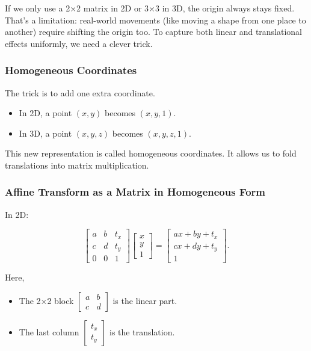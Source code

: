 \documentclass[
  letterpaper,
  DIV=11,
  numbers=noendperiod]{scrreprt}
\providecommand{\tightlist}{%
  \setlength{\itemsep}{0pt}\setlength{\parskip}{0pt}}
\begin{document}
If we only use a 2×2 matrix in 2D or 3×3 in 3D, the origin always stays
fixed. That's a limitation: real-world movements (like moving a shape
from one place to another) require shifting the origin too. To capture
both linear and translational effects uniformly, we need a clever trick.

\subsubsection{Homogeneous Coordinates}\label{homogeneous-coordinates}

The trick is to add one extra coordinate.

\begin{itemize}
\tightlist
\item
  In 2D, a point \((x, y)\) becomes \((x, y, 1)\).
\item
  In 3D, a point \((x, y, z)\) becomes \((x, y, z, 1)\).
\end{itemize}

This new representation is called homogeneous coordinates. It allows us
to fold translations into matrix multiplication.

\subsubsection{Affine Transform as a Matrix in Homogeneous
Form}\label{affine-transform-as-a-matrix-in-homogeneous-form}

In 2D:

\[
\begin{bmatrix} 
a & b & t_x \\ 
c & d & t_y \\ 
0 & 0 & 1 
\end{bmatrix}
\begin{bmatrix} 
x \\ y \\ 1
\end{bmatrix}
=
\begin{bmatrix} 
ax + by + t_x \\ 
cx + dy + t_y \\ 
1
\end{bmatrix}.
\]

Here,

\begin{itemize}
\tightlist
\item
  The 2×2 block \(\begin{bmatrix} a & b \\ c & d \end{bmatrix}\) is the
  linear part.
\item
  The last column \(\begin{bmatrix} t_x \\ t_y \end{bmatrix}\) is the
  translation.
\end{itemize}
\end{document}
